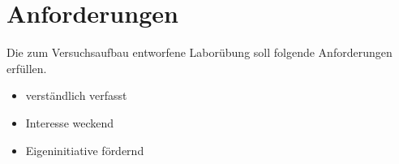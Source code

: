 \chapter{Anforderungen}

Die zum Versuchsaufbau entworfene Laborübung soll folgende Anforderungen erfüllen.

\begin{itemize}
    \item verständlich verfasst
    \item Interesse weckend
    \item Eigeninitiative fördernd
\end{itemize}
